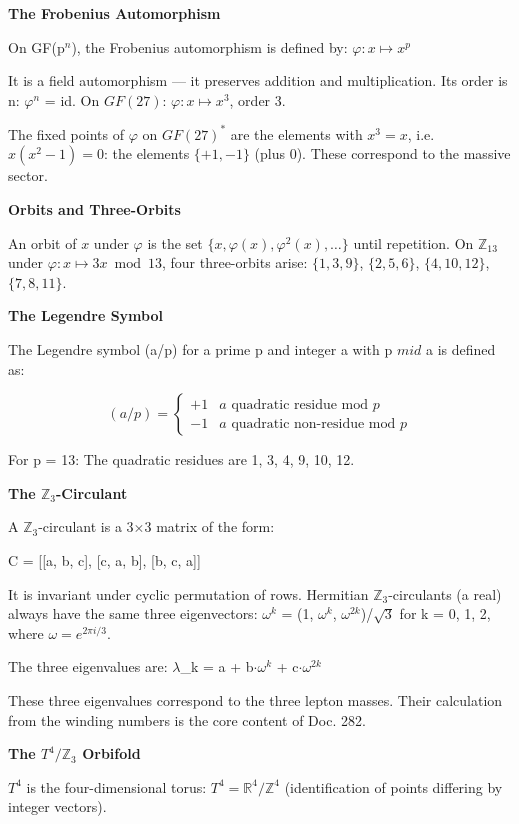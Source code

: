 \documentclass[11pt,oneside]{book}
\begin{document}
\textbf{The Frobenius Automorphism}

On GF(p$^n$), the Frobenius automorphism is defined by:
$\varphi: x \mapsto x^p$

It is a field automorphism — it preserves addition and multiplication.
Its order is n: $\varphi^n$ = id. On $GF(27)$: $\varphi: x \mapsto x^3$, order 3.

The fixed points of $\varphi$ on $GF(27)^*$ are the elements with $x^3 = x$, i.e.
$x(x^2-1) = 0$: the elements $\{+1, -1\}$ (plus 0). These correspond to the
massive sector.

\textbf{Orbits and Three-Orbits}

An orbit of $x$ under $\varphi$ is the set $\{x, \varphi(x), \varphi^2(x), \ldots\}$ until repetition.
On $\mathbb{Z}_{13}$ under $\varphi: x \mapsto 3x \bmod 13$, four three-orbits arise:
$\{1,3,9\}$, $\{2,5,6\}$, $\{4,10,12\}$, $\{7,8,11\}$.

\textbf{The Legendre Symbol}

The Legendre symbol (a/p) for a prime p and integer a with p $
mid$ a is
defined as:

\[(a/p) = \begin{cases} +1 & a \text{ quadratic residue mod } p \\ -1 & a \text{ quadratic non-residue mod } p \end{cases}\]

For p = 13: The quadratic residues are {1, 3, 4, 9, 10, 12}.

\textbf{The $\mathbb{Z}_3$-Circulant}

A $\mathbb{Z}_3$-circulant is a 3$\times$3 matrix of the form:

C = [[a, b, c], [c, a, b], [b, c, a]]

It is invariant under cyclic permutation of rows. Hermitian $\mathbb{Z}_3$-circulants
(a real) always have the same three eigenvectors:
$\omega^k$ = (1, $\omega^k$, $\omega^{2k}$)/$\sqrt{3}$ for k = 0, 1, 2, where $\omega = e^{2\pi i/3}$.

The three eigenvalues are:
$\lambda$\_k = a + b$\cdot\omega^k$ + c$\cdot\omega^{2k}$

These three eigenvalues correspond to the three lepton masses. Their
calculation from the winding numbers is the core content of Doc. 282.

\textbf{The $T^4/\mathbb{Z}_3$ Orbifold}

$T^4$ is the four-dimensional torus: $T^4 = \mathbb{R}^4/\mathbb{Z}^4$ (identification of points
differing by integer vectors).
\end{document}
